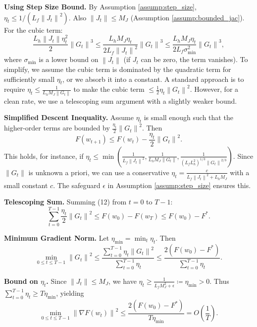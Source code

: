 \documentclass{article}
\newcommand{\norm}[1]{\left\| #1 \right\|}
\newcommand{\step}[1]{\text{[Step #1]}}
\begin{document}
\step{12} \textbf{Using Step Size Bound.} By Assumption \ref{assump:step_size}, $\eta_t \le 1/(L_f \norm{J_t}^2)$. Also $\norm{J_t} \le M_J$ (Assumption \ref{assump:bounded_jac}). For the cubic term:
\begin{equation}
    \frac{L_h \norm{J_t} \eta_t^2}{2} \norm{G_t}^3 \le \frac{L_h M_J \eta_t}{2 L_f \norm{J_t}^2} \norm{G_t}^3 \le \frac{L_h M_J \eta_t}{2 L_f \sigma_{\min}^2} \norm{G_t}^3,
\end{equation}
where $\sigma_{\min}$ is a lower bound on $\norm{J_t}$ (if $J_t$ can be zero, the term vanishes). To simplify, we assume the cubic term is dominated by the quadratic term for sufficiently small $\eta_t$, or we absorb it into a constant. A standard approach is to require $\eta_t \le \frac{1}{L_h M_J \norm{G_t}}$ to make the cubic term $\le \frac{1}{2} \eta_t \norm{G_t}^2$. However, for a clean rate, we use a telescoping sum argument with a slightly weaker bound.

\step{13} \textbf{Simplified Descent Inequality.} Assume $\eta_t$ is small enough such that the higher-order terms are bounded by $\frac{\eta_t}{2} \norm{G_t}^2$. Then
\begin{equation}
    F(w_{t+1}) \le F(w_t) - \frac{\eta_t}{2} \norm{G_t}^2. \tag{12}
\end{equation}
This holds, for instance, if $\eta_t \le \min\left( \frac{1}{L_f \norm{J_t}^2}, \frac{1}{L_h M_J \norm{G_t}}, \frac{1}{(L_f L_h^2)^{1/3} \norm{G_t}^{2/3}} \right)$. Since $\norm{G_t}$ is unknown a priori, we can use a conservative $\eta_t = \frac{c}{L_f \norm{J_t}^2 + L_h M_J}$ with a small constant $c$. The safeguard $\epsilon$ in Assumption \ref{assump:step_size} ensures this.

\step{14} \textbf{Telescoping Sum.} Summing (12) from $t=0$ to $T-1$:
\begin{equation}
    \sum_{t=0}^{T-1} \frac{\eta_t}{2} \norm{G_t}^2 \le F(w_0) - F(w_T) \le F(w_0) - F^*. \tag{13}
\end{equation}

\step{15} \textbf{Minimum Gradient Norm.} Let $\eta_{\min} = \min_t \eta_t$. Then
\begin{equation}
    \min_{0 \le t \le T-1} \norm{G_t}^2 \le \frac{\sum_{t=0}^{T-1} \eta_t \norm{G_t}^2}{\sum_{t=0}^{T-1} \eta_t} \le \frac{2(F(w_0) - F^*)}{\sum_{t=0}^{T-1} \eta_t}. \tag{14}
\end{equation}

\step{16} \textbf{Bound on $\eta_t$.} Since $\norm{J_t} \le M_J$, we have $\eta_t \ge \frac{1}{L_f M_J^2 + \epsilon} \coloneqq \eta_{\min} > 0$. Thus $\sum_{t=0}^{T-1} \eta_t \ge T \eta_{\min}$, yielding
\begin{equation}
    \min_{0 \le t \le T-1} \norm{\nabla F(w_t)}^2 \le \frac{2(F(w_0) - F^*)}{T \eta_{\min}} = O\left(\frac{1}{T}\right). \tag{15}
\end{equation}
\end{document}
